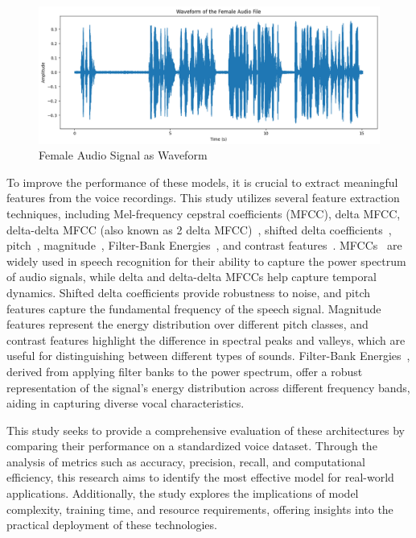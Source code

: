 \documentclass[conference, 10pt]{IEEEtran}
\begin{document}
\begin{figure}
    \centering
    \includegraphics[width=3 in]{Dataset-Female.png}
    \caption{Female Audio Signal as Waveform}
    \label{fig:Dataset-Female}
\end{figure}

To improve the performance of these models, it is crucial to extract meaningful features from the voice recordings. This study utilizes several feature extraction techniques, including Mel-frequency cepstral coefficients (MFCC), delta MFCC, delta-delta MFCC (also known as 2 delta MFCC)~\cite{singh2014approach}, shifted delta coefficients~\cite{torres2002approaches}, pitch~\cite{yang2016pitch}, magnitude~\cite{kobayashi2014acoustic}, Filter-Bank Energies~\cite{tak2017novel}, and contrast features~\cite{arandjelovic2018objects}. MFCCs~\cite{singh2014approach} are widely used in speech recognition for their ability to capture the power spectrum of audio signals, while delta and delta-delta MFCCs help capture temporal dynamics. Shifted delta coefficients provide robustness to noise, and pitch features capture the fundamental frequency of the speech signal. Magnitude~\cite{kobayashi2014acoustic} features represent the energy distribution over different pitch classes, and contrast features highlight the difference in spectral peaks and valleys, which are useful for distinguishing between different types of sounds. Filter-Bank Energies~\cite{tak2017novel}, derived from applying filter banks to the power spectrum, offer a robust representation of the signal's energy distribution across different frequency bands, aiding in capturing diverse vocal characteristics.

This study seeks to provide a comprehensive evaluation of these architectures by comparing their performance on a standardized voice dataset. Through the analysis of metrics such as accuracy, precision, recall, and computational efficiency, this research aims to identify the most effective model for real-world applications. Additionally, the study explores the implications of model complexity, training time, and resource requirements, offering insights into the practical deployment of these technologies.
\end{document}
